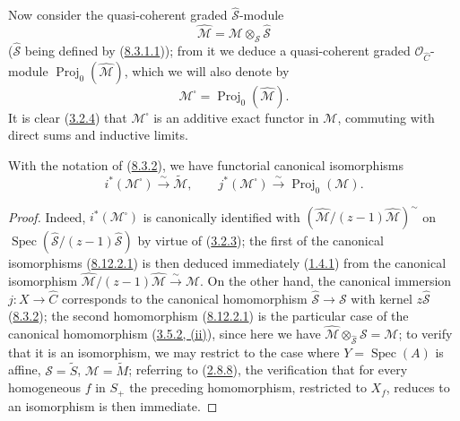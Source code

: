 \begin{env}[8.12.1]
Now consider the quasi-coherent graded
$\widehat{\mathcal{S}}$-module
\begin{equation}
\label{II.8.12.1.4}
  \widehat{\mathcal{M}}
  =\mathcal{M}\otimes_{\mathcal{S}}\widehat{\mathcal{S}}
\tag{8.12.1.4}
\end{equation}
($\widehat{\mathcal{S}}$ being defined by
(\hyperref[II.8.3.1.1]{8.3.1.1})); from it we deduce a quasi-coherent
graded $\mathcal{O}_{\widehat{C}}$-module
$\operatorname{Proj}_0(\widehat{\mathcal{M}})$, which we will also denote by
\begin{equation}
\label{II.8.12.1.5}
  \mathcal{M}^{\square}=\operatorname{Proj}_0(\widehat{\mathcal{M}}).
\tag{8.12.1.5}
\end{equation}
It is clear (\hyperref[II.3.2.4]{3.2.4}) that
$\mathcal{M}^{\square}$ is an additive exact functor in $\mathcal{M}$,
commuting with direct sums and inductive limits.
\end{env}

\begin{proposition}[8.12.2]
\label{II.8.12.2}
With the notation of (\hyperref[II.8.3.2]{8.3.2}), we have functorial
canonical isomorphisms
\begin{equation}
\label{II.8.12.2.1}
  i^*(\mathcal{M}^{\square})\xrightarrow{\sim}\widetilde{\mathcal{M}},
  \qquad
  j^*(\mathcal{M}^{\square})\xrightarrow{\sim}
  \operatorname{Proj}_0(\mathcal{M}).
\tag{8.12.2.1}
\end{equation}
\end{proposition}

\begin{proof}
Indeed, $i^*(\mathcal{M}^{\square})$ is canonically identified with
$\left(\widehat{\mathcal{M}}/(z-1)\widehat{\mathcal{M}}\right)^{\sim}$
on
$\operatorname{Spec}(\widehat{\mathcal{S}}/(z-1)\widehat{\mathcal{S}})$
by virtue of (\hyperref[II.3.2.3]{3.2.3}); the first of the canonical
isomorphisms (\hyperref[II.8.12.2.1]{8.12.2.1}) is then deduced immediately
(\hyperref[II.1.4.1]{1.4.1}) from the canonical isomorphism
$\widehat{\mathcal{M}}/(z-1)\widehat{\mathcal{M}}
\xrightarrow{\sim}\mathcal{M}$. On the other hand, the canonical immersion
$j:X\to\widehat{C}$ corresponds to the canonical homomorphism
$\widehat{\mathcal{S}}\to\mathcal{S}$ with kernel
$z\widehat{\mathcal{S}}$ (\hyperref[II.8.3.2]{8.3.2}); the second
homomorphism (\hyperref[II.8.12.2.1]{8.12.2.1}) is the particular case
of the canonical homomorphism (\hyperref[II.3.5.2]{3.5.2, (ii)}), since
here we have
$\widehat{\mathcal{M}}\otimes_{\widehat{\mathcal{S}}}\mathcal{S}
=\mathcal{M}$; to verify that it is an isomorphism, we may restrict to the
case where $Y=\operatorname{Spec}(A)$ is affine,
$\mathcal{S}=\widetilde{S}$, $\mathcal{M}=\widetilde{M}$; referring to
(\hyperref[II.2.8.8]{2.8.8}), the verification that for every homogeneous
$f$ in $S_+$ the preceding homomorphism, restricted to $X_f$, reduces to an
isomorphism is then immediate.
\end{proof}

